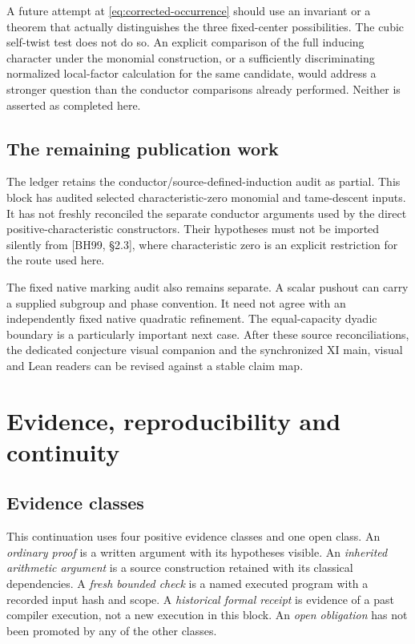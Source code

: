 \documentclass[11pt]{article}
\theoremstyle{definition}\newtheorem{definition}[proposition]{Definition}
\begin{document}
A future attempt at \eqref{eq:corrected-occurrence} should use an invariant or a theorem that actually distinguishes the three fixed-center possibilities. The cubic self-twist test does not do so. An explicit comparison of the full inducing character under the monomial construction, or a sufficiently discriminating normalized local-factor calculation for the same candidate, would address a stronger question than the conductor comparisons already performed. Neither is asserted as completed here.

\subsection{The remaining publication work}
The ledger retains the conductor/source-defined-induction audit as partial. This block has audited selected characteristic-zero monomial and tame-descent inputs. It has not freshly reconciled the separate conductor arguments used by the direct positive-characteristic constructors. Their hypotheses must not be imported silently from [BH99, \S2.3], where characteristic zero is an explicit restriction for the route used here.

The fixed native marking audit also remains separate. A scalar pushout can carry a supplied subgroup and phase convention. It need not agree with an independently fixed native quadratic refinement. The equal-capacity dyadic boundary is a particularly important next case. After these source reconciliations, the dedicated conjecture visual companion and the synchronized XI main, visual and Lean readers can be revised against a stable claim map.

\section{Evidence, reproducibility and continuity}\label{sec:evidence}
\subsection{Evidence classes}
This continuation uses four positive evidence classes and one open class. An \emph{ordinary proof} is a written argument with its hypotheses visible. An \emph{inherited arithmetic argument} is a source construction retained with its classical dependencies. A \emph{fresh bounded check} is a named executed program with a recorded input hash and scope. A \emph{historical formal receipt} is evidence of a past compiler execution, not a new execution in this block. An \emph{open obligation} has not been promoted by any of the other classes.
\end{document}
